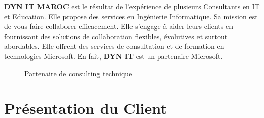\documentclass[a4paper]{report}
\begin{document}
\begin{doublespace}
	\textbf{DYN IT MAROC} est le résultat de l’expérience de plusieurs
	Consultants en IT et Education.
	Elle propose des services en Ingénierie Informatique.
	Sa mission est de vous faire collaborer efficacement. Elle s'engage à aider leurs clients
	en fournissant des solutions de collaboration flexibles, évolutives et
	surtout abordables.
	Elle offrent des services de consultation et de formation en technologies
	Microsoft. En fait, \textbf{DYN IT} est un partenaire Microsoft.
	\begin{figure}[H]
		\begin{center}
			\caption{Partenaire de consulting technique}
		\end{center}
	\end{figure}
	\section{Présentation du Client}


\end{doublespace}
\end{document}

